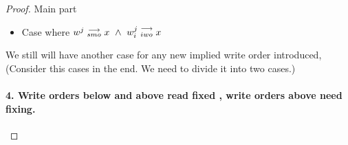 \begin{proof}{Main part}
\begin{itemize}
\begin{itemize}
                            \item Case where $w^j\stackrel{\longrightarrow}{_{smo}}x \ \wedge \ w_i^j\stackrel{\longrightarrow}{_{iwo}}x$



                        \end{itemize}

                \end{itemize}
            
            We still will have another case for any new implied write order introduced, (Consider this cases in the end. We need to divide it into two cases.)
            \paragraph{4. Write orders below and above read fixed , write orders above need fixing.} 
                

\end{proof}
